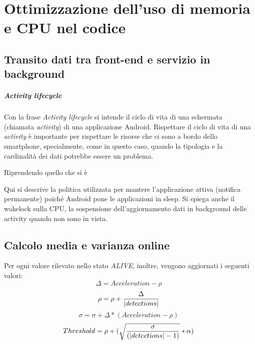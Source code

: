 \documentclass[a4paper,10pt]{memoir}
\begin{document}
\chapter{Ottimizzazione dell'uso di memoria e CPU nel codice}

\section{Transito dati tra front-end e servizio in background}

\paragraph{Activity lifecycle} Con la frase \textit{Activity lifecycle} si intende il ciclo di vita di una schermata (chiamata \textit{activity}) di una applicazione Android. Rispettare il ciclo di vita di una \textit{activity} è importante per rispettare le risorse che ci sono a bordo dello smartphone, specialmente, come in questo caso, quando la tipologia e la cardinalità dei dati potrebbe essere un problema.

Riprendendo quello che si è

Qui si descrive la politica utilizzata per mantere l'applicazione attiva (notifica permanente) poiché Android pone le applicazioni in sleep. Si spiega anche il wakelock sulla CPU, la sospensione dell'aggiornamento dati in background delle activity quando non sono in vista.

\section{Calcolo media e varianza online}

Per ogni valore rilevato nello stato \textit{ALIVE}, inoltre, vengono aggiornati i seguenti valori:
\begin{equation}
\Delta = Acceleration - \rho
\end{equation}
\begin{equation}
\rho = \rho + {\Delta \over |detections|}
\end{equation}
\begin{equation}
\sigma = \sigma + \Delta * (Acceleration - \rho)
\end{equation}
\begin{equation}
Threshold = \rho + (\sqrt{\sigma \over (|detections|-1)} * \alpha)
\end{equation}
\end{document}
